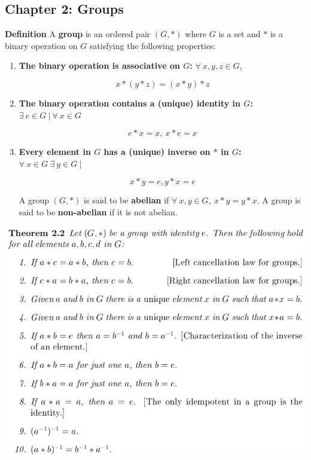 \documentclass{article}
\begin{document}
\pagebreak

\subsection{Chapter 2: Groups}

\textbf{Definition} A \textbf{group} is an ordered pair \((G, *)\) where \(G\) is a set and \(*\) is a binary operation on \(G\) satisfying the following properties:

\begin{enumerate}[1.]

\item \textbf{The binary operation is associative on \(G\):} \(\forall \ x, y , z \in G\), 

\[
x * (y * z) = (x * y) * z
\]

\item \textbf{The binary operation contains a (unique) identity in \(G\):} \(\exists \ e \in G \ | \ \forall \ x  \in  G\)

\[
e * x = x, \ x * e = x 
\]

\item \textbf{Every element in \(G\) has a (unique) inverse on \(*\) in \(G\):} \(\forall \ x \in G \ \exists \ y \in G \ |\)

\[
x*y = e, y*x =e
\]

A group \( (G, *)\) is said to be \textbf{abelian} if \(\forall \ x, y \in G, \ x*y = y*x\). A group is said to be \textbf{non-abelian} if it is not abelian.

\end{enumerate}

\includegraphics[scale=0.45]{group_properties}
\end{document}
